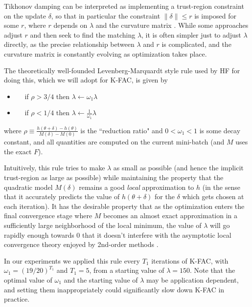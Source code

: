 \documentclass[12pt]{article}
\newcommand{\acronym}{K-FAC}
\begin{document}
Tikhonov damping can be interpreted as implementing a trust-region constraint on the update $\delta$, so that in particular the constraint $\|\delta\| \leq r$ is imposed for some $r$, where $r$ depends on $\lambda$ and the curvature matrix \citep[e.g.][]{nocedal_book}.  While some approaches adjust $r$ and then seek to find the matching $\lambda$, it is often simpler just to adjust $\lambda$ directly, as the precise relationship between $\lambda$ and $r$ is complicated, and the curvature matrix is constantly evolving as optimization takes place.


The theoretically well-founded Levenberg-Marquardt style rule used by HF for doing this, which we will adopt for \acronym{}, is given by
\begin{itemize}[label={}]
\item $\quad$ if $\rho > 3/4$ then $\lambda \leftarrow \omega_1 \lambda$
\item $\quad$ if $\rho < 1/4$ then $\displaystyle \lambda \leftarrow \frac{1}{\omega_1} \lambda$
\end{itemize}
where $\displaystyle \rho \equiv \frac{h(\theta + \delta) - h(\theta)}  {M(\delta) - M(0)}$ is the ``reduction ratio" and $0 < \omega_1 < 1$ is some decay constant, and all quantities are computed on the current mini-batch (and $M$ uses the exact $F$). 

Intuitively, this rule tries to make $\lambda$ as small as possible (and hence the implicit trust-region as large as possible) while maintaining the property that the quadratic model $M(\delta)$ remains a good \emph{local} approximation to $h$ (in the sense that it accurately predicts the value of $h(\theta + \delta)$ for the $\delta$ which gets chosen at each iteration).  It has the desirable property that as the optimization enters the final convergence stage where $M$ becomes an almost exact approximation in a sufficiently large neighborhood of the local minimum, the value of $\lambda$ will go rapidly enough towards $0$ that it doesn't interfere with the asymptotic local convergence theory enjoyed by 2nd-order methods \citep{levenberg_marquardt}.

In our experiments we applied this rule every $T_1$ iterations of \acronym{}, with $\omega_1 = (19/20)^{T_1}$ and $T_1 = 5$, from a starting value of $\lambda = 150$.  Note that the optimal value of $\omega_1$ and the starting value of $\lambda$ may be application dependent, and setting them inappropriately could significantly slow down \acronym{} in practice. 
\end{document}
